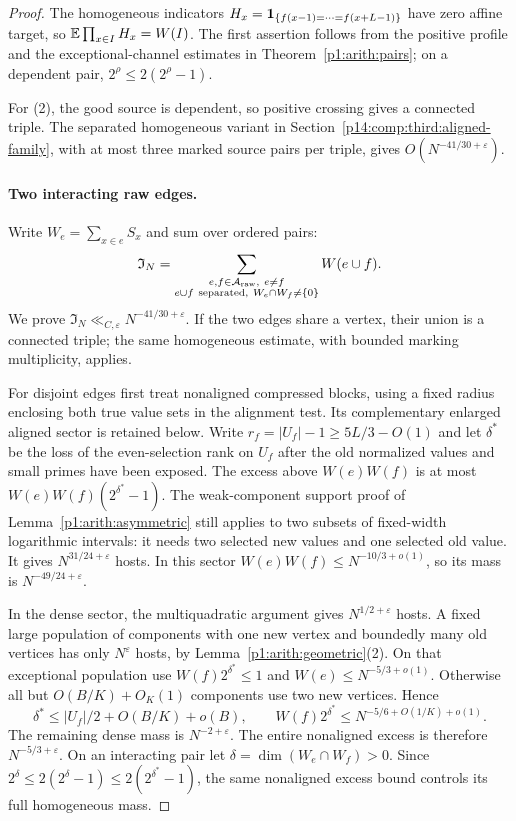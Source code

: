 \begin{proof}
The homogeneous indicators
$H_x=\mathbf 1_{\{f(x-1)=\cdots=f(x+L-1)\}}$ have zero affine target, so
$\mathbb E\prod_{x\in I}H_x=W(I)$. The first assertion follows from the
positive profile and the exceptional-channel estimates in
Theorem~\ref{p1:arith:pairs}; on a dependent pair,
$2^\rho\le2(2^\rho-1)$.

For (2), the good source is dependent, so positive crossing gives a
connected triple.
The separated homogeneous variant in
Section~\ref{p14:comp:third:aligned-family}, with at most three marked
source pairs per triple, gives $O(N^{-41/30+\varepsilon})$.

\paragraph{Two interacting raw edges.}
Write $W_e=\sum_{x\in e}S_x$ and sum over ordered pairs:
\[
 \mathfrak I_N=
 \sum_{\substack{e,f\in\mathcal A_{\rm raw},\ e\ne f\\
                  e\cup f\ {\rm separated},\ W_e\cap W_f\ne\{0\}}}W(e\cup f).
\]
We prove $\mathfrak I_N\ll_{C,\varepsilon}N^{-41/30+\varepsilon}$.
If the two edges share a vertex, their union is a connected triple;
the same homogeneous estimate, with bounded marking multiplicity, applies.

For disjoint edges first treat nonaligned compressed blocks, using
a fixed radius enclosing both true value sets in the alignment test.
Its complementary enlarged aligned sector is retained below.  Write
$r_f=|U_f|-1\geq5L/3-O(1)$ and let $\delta^*$ be the loss of the
even-selection rank on $U_f$ after the old normalized values and small
primes have been exposed.  The excess above $W(e)W(f)$ is at most
$W(e)W(f)(2^{\delta^*}-1)$.
The weak-component support proof of Lemma~\ref{p1:arith:asymmetric}
still applies to two subsets of fixed-width logarithmic intervals:
it needs two selected new values and one selected old value.
It gives $N^{31/24+\varepsilon}$ hosts.  In this sector
$W(e)W(f)\leq N^{-10/3+o(1)}$, so its mass is
$N^{-49/24+\varepsilon}$.

In the dense sector, the multiquadratic argument gives
$N^{1/2+\varepsilon}$ hosts.  A fixed large population of components
with one new vertex and boundedly many old vertices has only
$N^\varepsilon$ hosts, by Lemma~\ref{p1:arith:geometric}(2).
On that exceptional population use $W(f)2^{\delta^*}\leq1$ and
$W(e)\leq N^{-5/3+o(1)}$.  Otherwise all but
$O(B/K)+O_K(1)$ components use two new vertices.  Hence
\[
 \delta^*\leq|U_f|/2+O(B/K)+o(B),\qquad
 W(f)2^{\delta^*}\leq N^{-5/6+O(1/K)+o(1)}.
\]
The remaining dense mass is $N^{-2+\varepsilon}$.
The entire nonaligned excess is therefore $N^{-5/3+\varepsilon}$.
On an interacting pair let $\delta=\dim(W_e\cap W_f)>0$.
Since $2^\delta\le2(2^\delta-1)\le2(2^{\delta^*}-1)$, the same
nonaligned excess bound controls its full homogeneous mass.


\end{proof}
